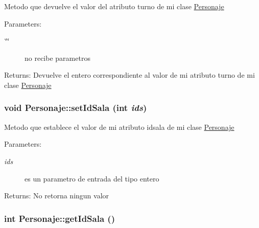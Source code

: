 Metodo que devuelve el valor del atributo turno de mi clase \hyperlink{classPersonaje}{Personaje} \begin{Desc}
\item[Parameters:]
\begin{description}
\item[{\em \char`\"{}\char`\"{}}]no recibe parametros \end{description}
\end{Desc}
\begin{Desc}
\item[Returns:]Devuelve el entero correspondiente al valor de mi atributo turno de mi clase \hyperlink{classPersonaje}{Personaje} \end{Desc}
\hypertarget{classPersonaje_43a551a88fe3c6d4458719135992114b}{
\subsubsection[setIdSala]{\setlength{\rightskip}{0pt plus 5cm}void Personaje::setIdSala (int {\em ids})}}
\label{classPersonaje_43a551a88fe3c6d4458719135992114b}


Metodo que establece el valor de mi atributo idsala de mi clase \hyperlink{classPersonaje}{Personaje} \begin{Desc}
\item[Parameters:]
\begin{description}
\item[{\em ids}]es un parametro de entrada del tipo entero \end{description}
\end{Desc}
\begin{Desc}
\item[Returns:]No retorna ningun valor \end{Desc}
\hypertarget{classPersonaje_5266df5bdfa75df5dfc631d94be2993d}{
\subsubsection[getIdSala]{\setlength{\rightskip}{0pt plus 5cm}int Personaje::getIdSala ()}}
\label{classPersonaje_5266df5bdfa75df5dfc631d94be2993d}


